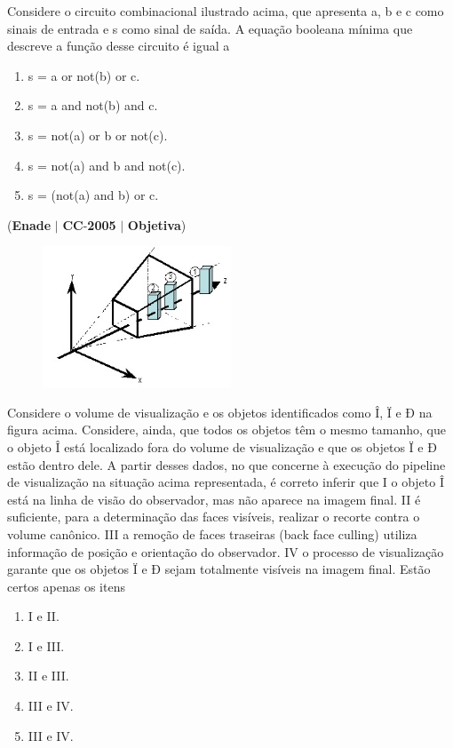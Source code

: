 \documentclass{exam}
\begin{document}
\begin{questions}
Considere o circuito combinacional ilustrado acima, que apresenta
a, b e c como sinais de entrada e s como sinal de saída. A equação
booleana mínima que descreve a função desse circuito é igual a
	\begin{enumerate}[label=\alph*)]
		\item  s = a or not(b) or c.
		\item  s = a and not(b) and c.
		\item  s = not(a) or b or not(c).
		\item  s = not(a) and b and not(c).
		\item  s = (not(a) and b) or c.
	\end{enumerate}

\question (\textbf{Enade} $|$ \textbf{CC}-\textbf{2005} $|$ \textbf{Objetiva})

\begin{figure}[H]
	\begin{center}
		\includegraphics[width=0.5\textwidth]{CIENCIA_DA_COMPUTACAO_Prova2005-utf8_figuras/fig-0030.jpg}
	\end{center}
\end{figure}
Considere o volume de visualização e os objetos identificados
como Î, Ï e Ð na figura acima. Considere, ainda, que todos os
objetos têm o mesmo tamanho, que o objeto Î está localizado fora
do volume de visualização e que os objetos Ï e Ð estão dentro
dele. A partir desses dados, no que concerne à execução do
pipeline de visualização na situação acima representada, é correto
inferir que
I o objeto Î está na linha de visão do observador, mas não
aparece na imagem final.
II é suficiente, para a determinação das faces visíveis, realizar o
recorte contra o volume canônico.
III a remoção de faces traseiras (back face culling) utiliza
informação de posição e orientação do observador.
IV o processo de visualização garante que os objetos Ï e Ð sejam
totalmente visíveis na imagem final.
Estão certos apenas os itens
	\begin{enumerate}[label=\alph*)]
		\item  I e II.
		\item  I e III.
		\item  II e III.
		\item  III e IV.
		\item  III e IV.
	\end{enumerate}


\end{questions}
\end{document}

